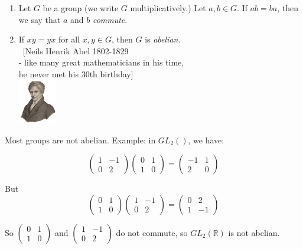 \documentclass[10pt]{scrartcl}
\begin{document}
\begin{definition}\begin{enumerate}
 \item Let $G$ be a group (we write $G$ multiplicatively.) Let $a,b \in G$. If $ab = ba$, then we say that $a$ and $b$ \emph{commute}. 
 \item 

 If $xy = yx$ for all $x,y \in G$, then $G$ is \emph{abelian}.\\ ~[Neils Henrik Abel 1802-1829\\ - like many great mathematicians in his time,\\ he never met his 30th birthday]  \\[-2cm] \vspace*{-50pt} \hspace*{260pt} \includegraphics[width=0.13\textwidth]{abel.jpg}
 \end{enumerate}
 \vspace*{50pt}
  \end{definition}

  Most groups are not abelian. Example: in $GL_2()$, we have:

\[\begin{pmatrix}
1 & -1 \\ 0 & 2
\end{pmatrix}
\begin{pmatrix}
0 & 1 \\ 1 & 0
\end{pmatrix}
= 
\begin{pmatrix}
-1 & 1\\ 2 & 0
\end{pmatrix}\]

But 
\[
\begin{pmatrix}
0 & 1 \\ 1 & 0
\end{pmatrix}
\begin{pmatrix}
1 & -1 \\ 0 & 2
\end{pmatrix}
=
\begin{pmatrix}
0 & 2 \\ 1 & -1
\end{pmatrix}\]

So $\left(\begin{smallmatrix}
0 & 1\\ 1 & 0
\end{smallmatrix}\right)
$ and $\left(\begin{smallmatrix}
1 & -1\\ 0 & 2
\end{smallmatrix}\right)
$ do not commute, so $GL_2(\mathbb{R})$ is not abelian.\\
\end{document}
